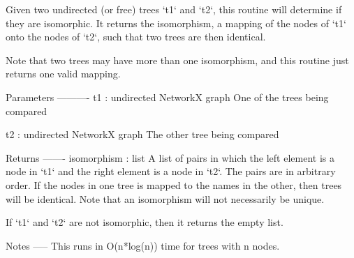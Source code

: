 \begin{DoxyVerb}Given two undirected (or free) trees `t1` and `t2`,
this routine will determine if they are isomorphic.
It returns the isomorphism, a mapping of the nodes of `t1` onto the nodes
of `t2`, such that two trees are then identical.

Note that two trees may have more than one isomorphism, and this
routine just returns one valid mapping.

Parameters
----------
t1 : undirected NetworkX graph
    One of the trees being compared

t2 : undirected NetworkX graph
    The other tree being compared

Returns
-------
isomorphism : list
    A list of pairs in which the left element is a node in `t1`
    and the right element is a node in `t2`.  The pairs are in
    arbitrary order.  If the nodes in one tree is mapped to the names in
    the other, then trees will be identical. Note that an isomorphism
    will not necessarily be unique.

    If `t1` and `t2` are not isomorphic, then it returns the empty list.

Notes
-----
This runs in O(n*log(n)) time for trees with n nodes.
\end{DoxyVerb}
 